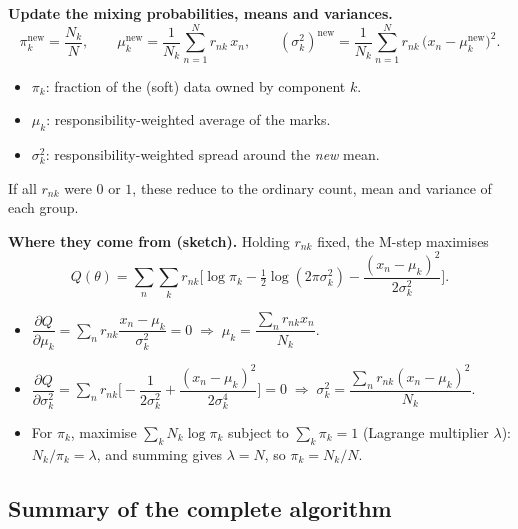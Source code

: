 \documentclass[11pt,a4paper]{article}
\begin{document}
\textbf{Update the mixing probabilities, means and variances.}
\[
\pi_k^{\text{new}}=\frac{N_k}{N},\qquad
\mu_k^{\text{new}}=\frac{1}{N_k}\sum_{n=1}^N r_{nk}\,x_n,\qquad
(\sigma_k^2)^{\text{new}}=\frac{1}{N_k}\sum_{n=1}^N r_{nk}\,\big(x_n-\mu_k^{\text{new}}\big)^2.
\]
\begin{itemize}[nosep]
\item $\pi_k$: fraction of the (soft) data owned by component $k$.
\item $\mu_k$: responsibility-weighted average of the marks.
\item $\sigma_k^2$: responsibility-weighted spread around the \emph{new} mean.
\end{itemize}
If all $r_{nk}$ were $0$ or $1$, these reduce to the ordinary count, mean and variance of each group.

\textbf{Where they come from (sketch).} Holding $r_{nk}$ fixed, the M-step maximises
\[
Q(\theta)=\sum_n\sum_kr_{nk}\Big[\log\pi_k-\tfrac12\log(2\pi\sigma_k^2)-\frac{(x_n-\mu_k)^2}{2\sigma_k^2}\Big].
\]
\begin{itemize}[leftmargin=*]
\item $\dfrac{\partial Q}{\partial\mu_k}=\sum_nr_{nk}\dfrac{x_n-\mu_k}{\sigma_k^2}=0\;\Rightarrow\;\mu_k=\dfrac{\sum_nr_{nk}x_n}{N_k}$.
\item $\dfrac{\partial Q}{\partial\sigma_k^2}=\sum_nr_{nk}\Big[-\dfrac{1}{2\sigma_k^2}+\dfrac{(x_n-\mu_k)^2}{2\sigma_k^4}\Big]=0\;\Rightarrow\;\sigma_k^2=\dfrac{\sum_nr_{nk}(x_n-\mu_k)^2}{N_k}$.
\item For $\pi_k$, maximise $\sum_kN_k\log\pi_k$ subject to $\sum_k\pi_k=1$ (Lagrange multiplier $\lambda$): $N_k/\pi_k=\lambda$, and summing gives $\lambda=N$, so $\pi_k=N_k/N$.
\end{itemize}

\subsection{Summary of the complete algorithm}
\end{document}
